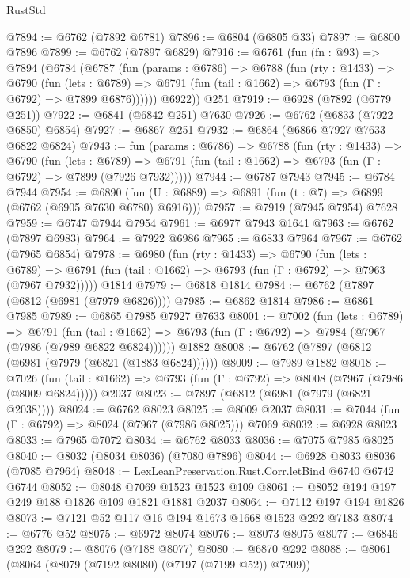 \begin{lexlean}{RustStd}
\begin{coremodule}
@7894 := @6762 (@7892 @6781)
@7896 := @6804 (@6805 @33)
@7897 := @6800 @7896
@7899 := @6762 (@7897 @6829)
@7916 := @6761
    (fun (fn : @93) =>
    @7894
      (@6784
        (@6787
          (fun (params : @6786) =>
          @6788
            (fun (rty : @1433) =>
            @6790
              (fun (lets : @6789) =>
              @6791 (fun (tail : @1662) => @6793 (fun (Γ : @6792) => @7899 @6876))))))
        @6922))
    @251
@7919 := @6928 (@7892 (@6779 @251))
@7922 := @6841 (@6842 @251) @7630
@7926 := @6762 (@6833 (@7922 @6850) @6854)
@7927 := @6867 @251
@7932 := @6864 (@6866 @7927 @7633 @6822 @6824)
@7943 := fun (params : @6786) =>
  @6788
    (fun (rty : @1433) =>
    @6790
      (fun (lets : @6789) =>
      @6791 (fun (tail : @1662) => @6793 (fun (Γ : @6792) => @7899 (@7926 @7932)))))
@7944 := @6787 @7943
@7945 := @6784 @7944
@7954 := @6890 (fun (U : @6889) => @6891 (fun (t : @7) => @6899 (@6762 (@6905 @7630 @6780) @6916)))
@7957 := @7919 (@7945 @7954) @7628
@7959 := @6747 @7944 @7954
@7961 := @6977 @7943 @1641
@7963 := @6762 (@7897 @6983)
@7964 := @7922 @6986
@7965 := @6833 @7964
@7967 := @6762 (@7965 @6854)
@7978 := @6980
    (fun (rty : @1433) =>
    @6790
      (fun (lets : @6789) =>
      @6791 (fun (tail : @1662) => @6793 (fun (Γ : @6792) => @7963 (@7967 @7932)))))
    @1814
@7979 := @6818 @1814
@7984 := @6762 (@7897 (@6812 (@6981 (@7979 @6826))))
@7985 := @6862 @1814
@7986 := @6861 @7985
@7989 := @6865 @7985 @7927 @7633
@8001 := @7002
    (fun (lets : @6789) =>
    @6791
      (fun (tail : @1662) => @6793 (fun (Γ : @6792) => @7984 (@7967 (@7986 (@7989 @6822 @6824))))))
    @1882
@8008 := @6762 (@7897 (@6812 (@6981 (@7979 (@6821 (@1883 @6824))))))
@8009 := @7989 @1882
@8018 := @7026
    (fun (tail : @1662) => @6793 (fun (Γ : @6792) => @8008 (@7967 (@7986 (@8009 @6824)))))
    @2037
@8023 := @7897 (@6812 (@6981 (@7979 (@6821 @2038))))
@8024 := @6762 @8023
@8025 := @8009 @2037
@8031 := @7044 (fun (Γ : @6792) => @8024 (@7967 (@7986 @8025))) @7069
@8032 := @6928 @8023
@8033 := @7965 @7072
@8034 := @6762 @8033
@8036 := @7075 @7985 @8025
@8040 := @8032 (@8034 @8036) (@7080 @7896)
@8044 := @6928 @8033 @8036 (@7085 @7964)
@8048 := LexLeanPreservation.Rust.Corr.letBind @6740 @6742 @6744
@8052 := @8048 @7069 @1523 @1523 @109
@8061 := @8052 @194 @197 @249 @188 @1826 @109 @1821 @1881 @2037
@8064 := @7112 @197 @194 @1826
@8073 := @7121 @52 @117 @16 @194 @1673 @1668 @1523 @292 @7183
@8074 := @6776 @52
@8075 := @6972 @8074
@8076 := @8073 @8075
@8077 := @6846 @292
@8079 := @8076 (@7188 @8077)
@8080 := @6870 @292
@8088 := @8061 (@8064 (@8079 (@7192 @8080) (@7197 (@7199 @52)) @7209))

\end{coremodule}
\end{lexlean}

